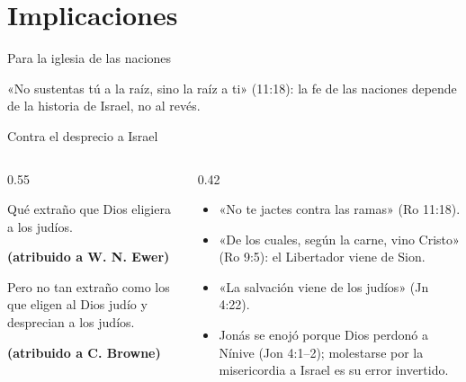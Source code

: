 \documentclass[hyperref={bookmarks=false},aspectratio=169]{beamer}
\newcommand{\fuente}[1]{\par\hfill{\upshape\bfseries\footnotesize\textcolor{ladrillo}{#1}}}
\newcommand{\notafig}[1]{\par\vspace{2pt}{\fontsize{5}{6}\selectfont\color{sepia}\hfill\textit{Nota.} #1\par}}
\newcommand{\elabpropia}{\notafig{Elaboración propia.}}
\begin{document}
\section{Implicaciones}
\begin{frame}{Para la iglesia de las naciones}
\centering
{}\par
\elabpropia\vspace{6pt}
\begin{clave}«No sustentas tú a la raíz, sino la raíz a ti» (11:18): la fe de las naciones depende de la historia de Israel, no al revés.\end{clave}
\end{frame}

\begin{frame}{Contra el desprecio a Israel}
\begin{columns}[c,onlytextwidth]
\begin{column}{0.55\textwidth}
\begin{cita}[fontupper=\small\itshape]Qué extraño que Dios eligiera a los judíos.\fuente{(atribuido a W. N. Ewer)}\end{cita}
\begin{cita}[fontupper=\small\itshape]Pero no tan extraño como los que eligen al Dios judío y desprecian a los judíos.\fuente{(atribuido a C. Browne)}\end{cita}
\end{column}
\begin{column}{0.42\textwidth}\scriptsize\RaggedRight
\begin{itemize}
\item «No te jactes contra las ramas» (Ro 11:18).
\item «De los cuales, según la carne, vino Cristo» (Ro 9:5): el Libertador viene de Sion.
\item «La salvación viene de los judíos» (Jn 4:22).
\item Jonás se enojó porque Dios perdonó a Nínive (Jon 4:1--2); molestarse por la misericordia a Israel es su error invertido.
\end{itemize}
\end{column}
\end{columns}
\end{frame}
\end{document}
